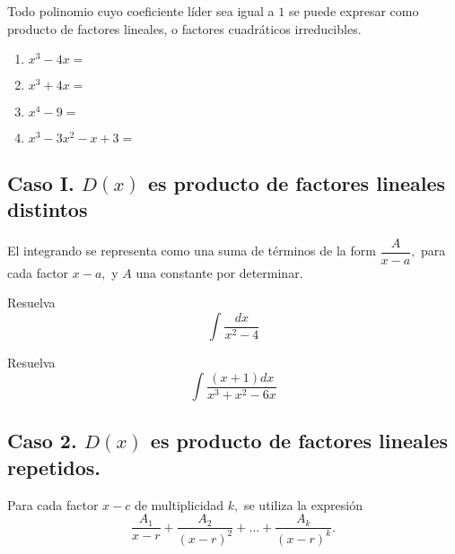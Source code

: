  \begin{teorema}
  \label{ayr:thm:33.1}
  Todo polinomio cuyo coeficiente líder sea igual a $1$ se puede expresar como producto de factores lineales, o factores cuadráticos irreducibles.
 \end{teorema}




 \begin{resuelto}
  \label{ayr:exmp:33.4}
  \begin{enumerate}
   \item $x^{3}-4x=$
   \item $x^{3}+4x=$
   \item $x^{4}-9=$
   \item $x^{3}-3x^{2}-x+3=$
  \end{enumerate}

 \end{resuelto}





\subsection{Caso I. $D(x)$ es producto de factores lineales distintos}





 El integrando se representa como una suma de términos de la form $\dfrac{A}{x-a},$ para cada factor $x-a,$ y $A$ una constante por determinar.

 \begin{resuelto}
	\label{ayr:exmp:33.5}
	Resuelva $$\int \dfrac{dx}{x^{2}-4}$$
\end{resuelto}




\begin{resuelto}
	\label{ayr:exmp:33.6}
	Resuelva $$\int\dfrac{(x+1)dx}{x^{3}+x^{2}-6x}$$
\end{resuelto}

\subsection{Caso 2. $D(x)$ es producto de factores lineales repetidos.}





 Para cada factor $x-c$ de multiplicidad $k,$ se utiliza la expresión
 $$
 \dfrac{A_{1}}{x-r}+\dfrac{A_{2}}{(x-r)^{2}}+...+\dfrac{A_{k}}{(x-r)^{k}}.
 $$

